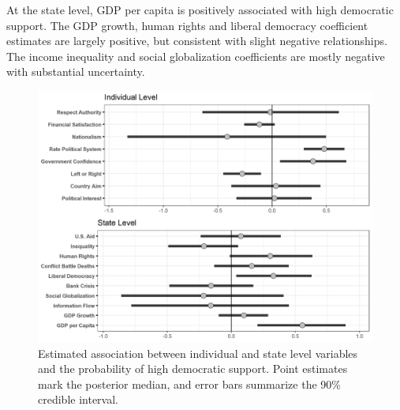 \documentclass[12pt]{article}
\begin{document}
At the state level, GDP per capita is positively associated with high democratic support. 
The GDP growth, human rights and liberal democracy coefficient estimates are largely positive, but consistent with slight negative relationships. 
The income inequality and social globalization coefficients are mostly negative with substantial uncertainty. 


\begin{figure}
\includegraphics[width = .95\textwidth]{other-levels-vars.png}
\caption{Estimated association between individual and state level variables and the probability of high democratic support. Point estimates mark the posterior median, and error bars summarize the 90\% credible interval.}
\label{fig:other-levels-vars} 
\end{figure}


%
%
%
%
\end{document}
